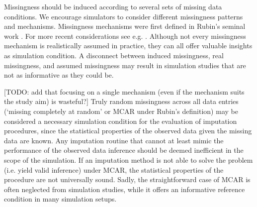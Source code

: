 \documentclass[bimj,fleqn]{w-art}
\begin{document}

Missingness should be induced according to several sets of missing data conditions. We encourage simulators to consider different missingness patterns and mechanisms. Missingness mechanisms were first defined in Rubin's seminal work \citep{rubi76}. For more recent considerations see e.g. \citet{seam13, meal15, dore18, more18, moha21, scho21}. Although not every missingness mechanism is realistically assumed in practice, they can all offer valuable insights as simulation condition. A disconnect between induced missingness, real missingness, and assumed missingness may result in simulation studies that are not as informative as they could be.

[TODO: add that focusing on a single mechanism (even if the mechanism suits the study aim) is wasteful?] Truly random missingness across all data entries (`missing completely at random' or MCAR under Rubin's definition) may be considered a necessary simulation condition for the evaluation of imputation procedures, since the statistical properties of the observed data given the missing data are known. Any imputation routine that cannot at least mimic the performance of the observed data inference should be deemed inefficient in the scope of the simulation. If an imputation method is not able to solve the problem (i.e. yield valid inference) under MCAR, the statistical properties of the procedure are not universally sound. Sadly, the straightforward case of MCAR is often neglected from simulation studies, while it offers an informative reference condition in many simulation setups.
\end{document}
